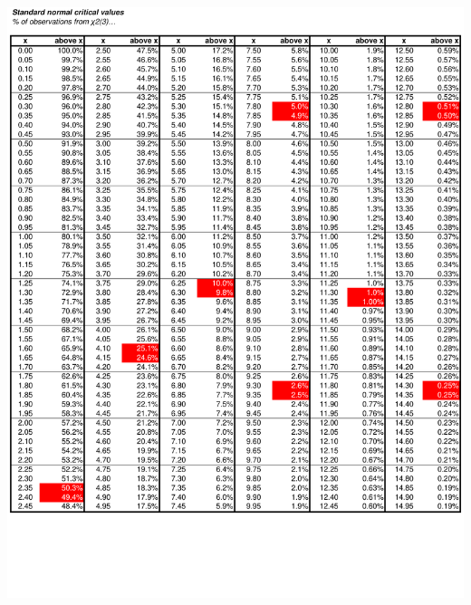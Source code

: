 \documentclass[8pt,letterpaper, landscape]{extarticle} %
\begin{document}
\begin{center}
\includegraphics[height=9.75in, angle=90]{images/cv5}

\end{center}
\end{document}
